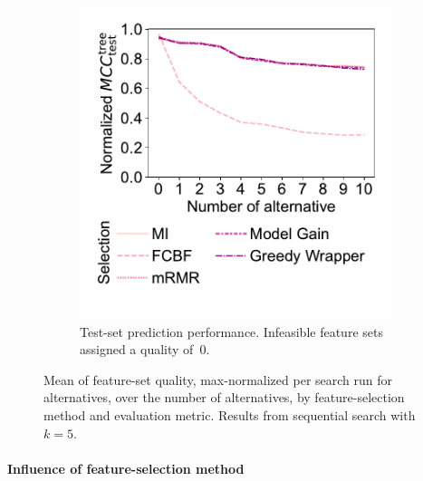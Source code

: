 \documentclass{article}
\theoremstyle{definition}
\begin{document}
\begin{figure}[p]
\begin{subfigure}[t]{0.48\textwidth}
		\includegraphics[width=\textwidth, trim=20 40 15 15, clip]{plots/afs-impact-num-alternatives-fs-method-decision-tree-test-mcc-max-fillna.pdf}
		\caption{
			Test-set prediction performance.
			Infeasible feature sets assigned a quality of~0.
		}
		\label{fig:afs:impact-num-alternatives-fs-method-decision-tree-test-mcc-max-fillna}
	\end{subfigure}
	\caption{
		Mean of feature-set quality, max-normalized per search run for alternatives, over the number of alternatives, by feature-selection method and evaluation metric.
		Results from sequential search with $k=5$.
	}
	\label{fig:afs:impact-num-alternatives-fs-method-quality}
\end{figure}

\paragraph{Influence of feature-selection method}
\end{document}
